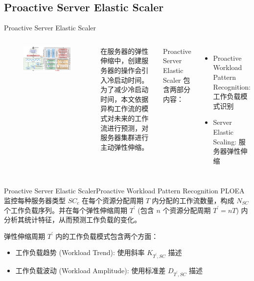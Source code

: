 \documentclass[aspectratio=169]{beamer}
\begin{document}
\subsection{Proactive Server Elastic Scaler}

\begin{frame}{Proactive Server Elastic Scaler}\label{label:proactive-server-elastic-scaler}
  \begin{columns}
    \begin{figure}
      \centering
      \includegraphics[scale=1.5]{img/method/proactive-server-elastic-scaler.pdf}
    \end{figure}

    在服务器的弹性伸缩中，创建服务器的操作会引入冷启动时间。为了减少冷启动时间，本文依据异构工作流的模式对未来的工作流进行预测，对服务器集群进行主动弹性伸缩。

    Proactive Server Elastic Scaler 包含两部分内容：
    \begin{itemize}
      \item Proactive Workload Pattern Recognition: 工作负载模式识别
      \item Server Elastic Scaling: 服务器弹性伸缩
    \end{itemize}
  \end{columns}
  \hfill\hyperlink{label:architecture-2}{}
\end{frame}

\begin{frame}{Proactive Server Elastic Scaler}{Proactive Workload Pattern Recognition}
  PLOEA 监控每种服务器类型 $SC_c$ 在每个资源分配周期 $T$ 内分配的工作流数量，构成 $N_{SC}$ 个工作负载序列。并在每个弹性伸缩周期 $T^\prime$ (包含 $n$ 个资源分配周期 $T^\prime = nT$) 内分析其统计特征，从而预测工作负载的变化。

  弹性伸缩周期 $T^\prime$ 内的工作负载模式包含两个方面：
  \begin{itemize}
    \item 工作负载趋势 (Workload Trend): 使用斜率 $K_{T^\prime, SC}$ 描述
    \item 工作负载波动 (Workload Amplitude): 使用标准差 $D_{T^\prime, SC}$ 描述
  \end{itemize}
\end{frame}
\end{document}

